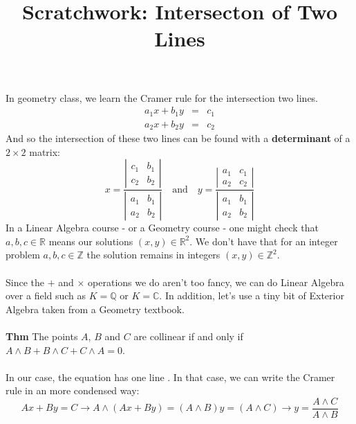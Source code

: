 \documentclass[12pt]{article}
\title{Scratchwork: Intersecton of Two Lines}
\date{}
\begin{document}

\sffamily

\maketitle

\noindent In geometry class, we learn the Cramer rule for the intersection two lines.
\begin{eqnarray*}
a_1 x + b_1 y &=& c_1 \\
a_2 x + b_2 y &=& c_2
\end{eqnarray*}
And so the intersection of these two lines can be found with a \textbf{determinant} of a $2 \times 2$ matrix:
$$ x = \frac{\left|\begin{array}{cc} c_1 & b_1 \\ c_2 & b_2 \end{array} \right|}{\left|\begin{array}{cc} a_1 & b_1 \\ a_2 & b_2 \end{array} \right|} \quad\text{and}\quad 
y = \frac{\left|\begin{array}{cc} a_1 & c_1 \\ a_2 & c_2 \end{array} \right|}{\left|\begin{array}{cc} a_1 & b_1 \\ a_2 & b_2 \end{array} \right|} $$
In a Linear Algebra course - or a Geometry course - one might check that $a,b,c \in \mathbb{R}$ means our solutions $(x,y) \in \mathbb{R}^2$.  We don't have that for an integer problem $a,b,c \in \mathbb{Z}$ the solution remains in integers $(x,y) \in \mathbb{Z}^2$. \\ \\
Since the $+$ and $\times$ operations we do aren't too fancy, we can do Linear Algebra over a field such as $K = \mathbb{Q}$ or $K = \mathbb{C}$.   In addition, let's use a tiny bit of Exterior Algebra taken from a Geometry textbook. \\ \\
\textbf{Thm}
The points $A$, $B$ and $C$ are collinear if and only if $ A \wedge B + B \wedge C + C \wedge A = 0$. \\ \\
In our case, the equation has one line \;.  In that case, we can write the Cramer rule in an more condensed way:
$$ Ax + By = C \to A \wedge (Ax + By)  = (A \wedge B) y = (A \wedge C) \to y = \frac{A \wedge C}{A \wedge B} $$
\end{document}
